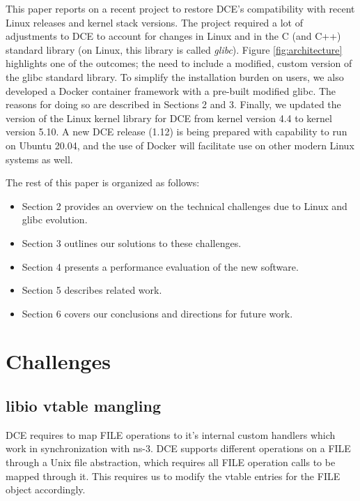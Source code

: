 \documentclass{sig-alternate}
\begin{document}
This paper reports on a recent project to restore DCE's compatibility with
recent Linux releases and kernel stack versions.  The project required
a lot of adjustments to DCE to account for changes in Linux and in the
C (and C++) standard library (on Linux, this library is called \emph{glibc}).
Figure \ref{fig:architecture} highlights one of the outcomes; the need to
include a modified, custom version of the glibc standard library.  To
simplify the installation burden on users, we also developed a Docker
container framework with a pre-built modified glibc.  The reasons for
doing so are described in Sections 2 and 3.  Finally, we updated the
version of the Linux kernel library for DCE from kernel version 4.4 
to kernel version 5.10.  A new DCE release (1.12) is being prepared with
capability to run on Ubuntu 20.04, and the use of Docker will facilitate
use on other modern Linux systems as well.

The rest of this paper is organized as follows:
\begin{itemize}
\item Section 2 provides an overview on the technical challenges due to Linux and glibc evolution.
\item Section 3 outlines our solutions to these challenges.
\item Section 4 presents a performance evaluation of the new software.
\item Section 5 describes related work.
\item Section 6 covers our conclusions and directions for future work.
\end{itemize}

\section{Challenges}

\subsection{libio vtable mangling}
DCE requires to map FILE operations to it's internal custom handlers which work in synchronization with ns-3. DCE supports different operations on a FILE 
through a Unix file abstraction, which requires all FILE operation calls to be mapped through it. This requires us to modify the vtable entries for the FILE
object accordingly.
\end{document}
